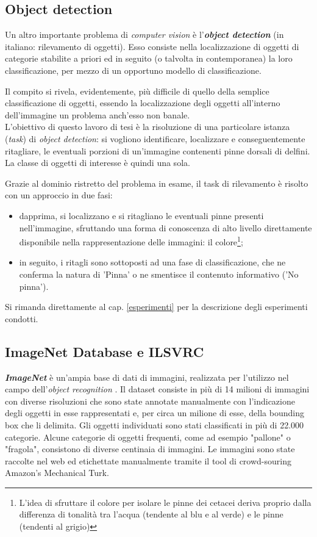 \subsection{Object detection}
\label{objectDetection}
Un altro importante problema di \textit{computer vision} è l'\textbf{\textit{object detection}} (in italiano: rilevamento di oggetti). Esso consiste nella localizzazione di oggetti di categorie stabilite a priori ed in seguito (o talvolta in contemporanea) la loro classificazione, per mezzo di un opportuno modello di classificazione.

Il compito si rivela, evidentemente, più difficile di quello della semplice classificazione di oggetti, essendo la localizzazione degli oggetti all'interno dell'immagine un problema anch'esso non banale.\\

L'obiettivo di questo lavoro di tesi è la risoluzione di una particolare istanza (\textit{task}) di \textit{object detection}: si vogliono identificare, localizzare e conseguentemente ritagliare, le eventuali porzioni di un'immagine contenenti pinne dorsali di delfini. La classe di oggetti di interesse è quindi una sola.

Grazie al dominio ristretto del problema in esame, il task di rilevamento è risolto con un approccio in due fasi:
\begin{itemize}
\item dapprima, si localizzano e si ritagliano le eventuali pinne presenti nell'immagine, sfruttando una forma di conoscenza di alto livello direttamente disponibile nella rappresentazione delle immagini: il colore\footnote{L'idea di sfruttare il colore per isolare le pinne dei cetacei deriva proprio dalla differenza di tonalità tra l'acqua (tendente al blu e al verde) e le pinne (tendenti al grigio)};
\item in seguito, i ritagli sono sottoposti ad una fase di classificazione, che ne conferma la natura di 'Pinna' o ne smentisce il contenuto informativo ('No pinna').
\end{itemize}
Si rimanda direttamente al cap. \ref{esperimenti} per la descrizione degli esperimenti condotti.

\subsection{ImageNet Database e ILSVRC}
\label{imagenet}
\textbf{\textit{ImageNet}} è un'ampia base di dati di immagini, realizzata per l'utilizzo nel campo dell'\textit{object recognition} \cite{imagenet}. Il dataset consiste in più di 14 milioni di immagini con diverse risoluzioni che sono state annotate manualmente con l'indicazione degli oggetti in esse rappresentati e, per circa un milione di esse, della bounding box che li delimita. Gli oggetti individuati sono stati classificati in più di 22.000 categorie. Alcune categorie di oggetti frequenti, come ad esempio "pallone" o "fragola", consistono di diverse centinaia di immagini.
Le immagini sono state raccolte nel web ed etichettate manualmente tramite il tool di crowd-souring Amazon’s Mechanical Turk.\\

